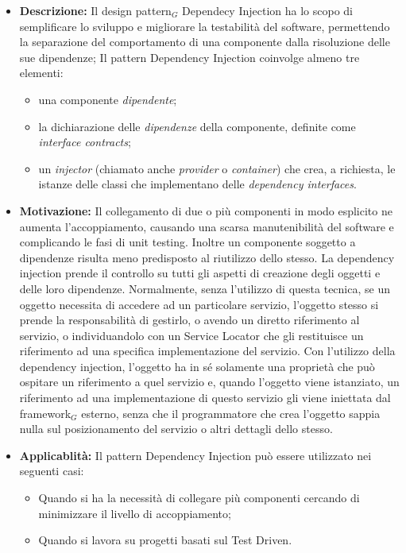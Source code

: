 \begin{itemize}
\item \textbf{Descrizione:} Il design pattern$_G$ Dependecy Injection ha lo scopo di semplificare lo sviluppo e migliorare la testabilità del software, permettendo la separazione del comportamento di una componente dalla risoluzione delle sue dipendenze;
Il pattern Dependency Injection coinvolge almeno tre elementi:

\begin{itemize}
\item una componente \textit{dipendente};
\item la dichiarazione delle \textit{dipendenze} della componente, definite come \textit{interface contracts};
\item un \textit{injector} (chiamato anche \textit{provider} o \textit{container}) che crea, a richiesta, le istanze delle classi che implementano delle \textit{dependency interfaces}.
\end{itemize}

\item \textbf{Motivazione:} Il collegamento di due o più componenti in modo esplicito ne aumenta l'accoppiamento, causando una scarsa manutenibilità del software e complicando le fasi di unit testing.
Inoltre un componente soggetto a dipendenze risulta meno predisposto al riutilizzo dello stesso.
La dependency injection prende il controllo su tutti gli aspetti di creazione degli oggetti e delle loro dipendenze. Normalmente, senza l'utilizzo di questa tecnica, se un oggetto necessita di accedere ad un particolare servizio, l'oggetto stesso si prende la responsabilità di gestirlo, o avendo un diretto riferimento al servizio, o individuandolo con un Service Locator che gli restituisce un riferimento ad una specifica implementazione del servizio. 
Con l'utilizzo della dependency injection, l'oggetto ha in sé solamente una proprietà che può ospitare un riferimento a quel servizio e, quando l'oggetto viene istanziato, un riferimento ad una implementazione di questo servizio gli viene iniettata dal framework$_G$ esterno, senza che il programmatore che crea l'oggetto sappia nulla sul posizionamento del servizio o altri dettagli dello stesso.
\item \textbf{Applicablità:} Il pattern Dependency Injection può essere utilizzato nei seguenti casi:

\begin{itemize}
\item Quando si ha la necessità di collegare più componenti cercando di minimizzare il livello di accoppiamento;
\item Quando si lavora su progetti basati sul Test Driven.
\end{itemize}

\end{itemize}

